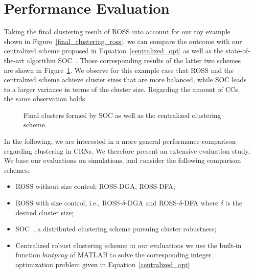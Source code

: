 \documentclass[times]{ettauth}
\newcommand{\ie}{i.e., }
\theoremstyle{mytheoremstyle}
\theoremstyle{mytheoremstyle}
\theoremstyle{mytheoremstyle}
\begin{document}
\section{Performance Evaluation}
\label{performance}
Taking the final clustering result of ROSS into account for our toy example shown in Figure~\ref{final_clustering_ross}, we can compare the outcome with our centralized scheme proposed in Equation~\ref{centralized_opt} as well as the state-of-the-art algorithm SOC~\cite{LIU_TMC11_2}.
Those corresponding results of the latter two schemes are shown in Figure~\ref{fig:final_clustering}.
We observe for this example case that ROSS and the centralized scheme achieve cluster sizes that are more balanced, while SOC leads to a larger variance in terms of the cluster size.
Regarding the amount of CCs, the same observation holds. 
\begin{figure}[ht]
\begin{center}
\hspace{0.15 in}
\end{center}
\caption{Final clusters formed by SOC as well as the centralized clustering scheme.}
\label{fig:final_clustering}
\end{figure}

In the following, we are interested in a more general performance comparison regarding clustering in CRNs.
We therefore present an extensive evaluation study.
We base our evaluations on simulations, and consider the following comparison schemes:
\begin{itemize}
\item ROSS without size control: ROSS-DGA, ROSS-DFA;
\item ROSS with size control, \ie ROSS-$\delta$-DGA and ROSS-$\delta$-DFA where $\delta$ is the desired cluster size;
\item SOC~\cite{LIU_TMC11_2}, a distributed clustering scheme pursuing cluster robustness;
\item Centralized robust clustering scheme; in our evaluations we use the built-in function $bintprog$ of MATLAB to solve the corresponding integer optimization problem given in Equation~\ref{centralized_opt}
\end{itemize}
\end{document}
